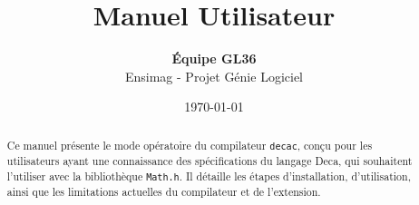 \documentclass[a4paper,11pt]{article}
\title{
    \vspace{2cm}
    \textbf{\Huge Manuel Utilisateur}\\
}
\author{
    \textbf{Équipe GL36} \\
    Ensimag - Projet Génie Logiciel
}
\date{\today}
\begin{document}
\maketitle

\begin{abstract}
\begin{center}
Ce manuel présente le mode opératoire du compilateur \texttt{decac}, conçu pour les utilisateurs ayant une connaissance des spécifications du langage Deca, qui souhaitent l'utiliser avec la bibliothèque \texttt{Math.h}. Il détaille les étapes d'installation, d'utilisation, ainsi que les limitations actuelles du compilateur et de l'extension.
\end{center}
\end{abstract}

\tableofcontents
\newpage






\end{document}
